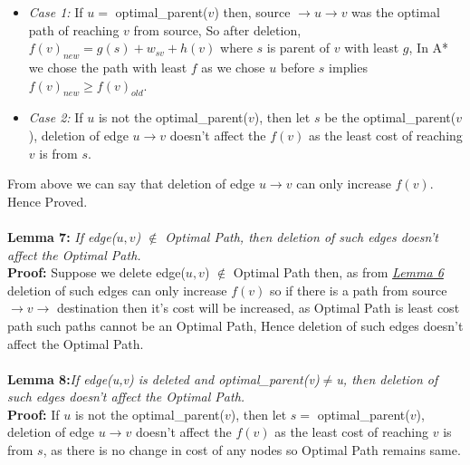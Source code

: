 \documentclass[a4paper]{article}
\begin{document}
\begin{itemize}[label={}]
    \item \textit{Case 1:} If $u =$ optimal\_parent($v$) then, source $\rightarrow u \rightarrow v$ was the optimal path of reaching $v$ from source, So after deletion, $f(v)_{new} = g(s) + w_{sv} + h(v)$ where $s$ is parent of $v$ with least $g$, In A* we chose the path with least $f$ as we chose $u$ before $s$ implies $f(v)_{new} \geq f(v)_{old}$.\\
    
    \item \textit{Case 2:} If $u$ is  not the optimal\_parent($v$), then let $s$ be the optimal\_parent($v$), deletion of edge $u \rightarrow v$ doesn't affect the $f(v)$ as the least cost of reaching $v$ is from $s$.\\
\end{itemize}
From above we can say that deletion of edge $u \rightarrow v$ can only increase $f(v)$. Hence Proved.\\
\\
\hypertarget{Lemma 7}{\textbf{Lemma 7:}} \textit{If edge($u,v$) $\notin$ Optimal Path, then deletion of such edges doesn't affect the Optimal Path.}\\
\textbf{Proof:} Suppose we delete edge($u,v$) $\notin$ Optimal Path then, as from \hyperlink{Lemma 6}{\textit{Lemma 6}} deletion of such edges can only increase $f(v)$ so if there is a path from source $\rightarrow v \rightarrow$ destination then it's cost will be increased, as Optimal Path is least cost path such paths cannot be an Optimal Path, Hence deletion of such edges doesn't affect the Optimal Path.\\
\\
\hypertarget{Lemma 8}{\textbf{Lemma 8:}}\textit{If edge(u,v) is deleted and optimal\_parent(v)$\neq$u, then deletion of such edges doesn't affect the Optimal Path.}\\
\textbf{Proof:} If $u$ is  not the optimal\_parent($v$), then let $s =$ optimal\_parent($v$), deletion of edge $u \rightarrow v$ doesn't affect the $f(v)$ as the least cost of reaching $v$ is from $s$, as there is no change in cost of any nodes so Optimal Path remains same.
\end{document}
